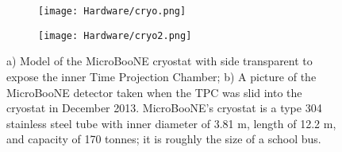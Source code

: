 \begin{figure}[H]
\centering
  \begin{subfigure}[t]{0.45\textwidth}
    \centering
\texttt{[image: Hardware/cryo.png]}
  \caption{ }
  \end{subfigure} 
  \begin{subfigure}[t]{0.5\textwidth}
    \centering
\texttt{[image: Hardware/cryo2.png]}
  \caption{ }
  \end{subfigure} 
\caption{a) Model of the MicroBooNE cryostat with side transparent to expose the inner Time Projection Chamber; b) A picture of the MicroBooNE detector taken when the TPC was slid into the cryostat in December 2013.  MicroBooNE's cryostat is a type 304 stainless steel tube with inner diameter of 3.81 m, length of 12.2 m, and capacity of 170 tonnes; it is roughly the size of a school bus. }
\label{fig:cryo2}
\end{figure}






